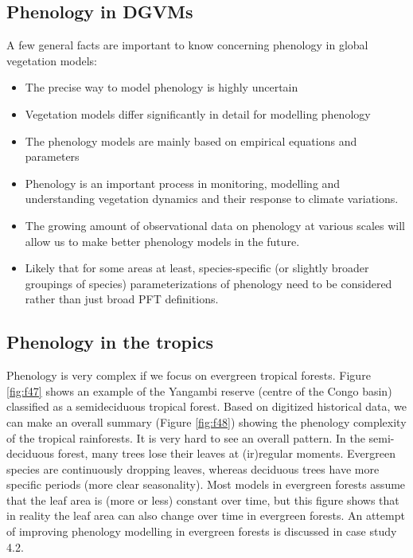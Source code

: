\documentclass[
  12pt,
  oneside]{book}
\begin{document}
\hypertarget{phenology-in-dgvms}{%
\subsection{Phenology in DGVMs}\label{phenology-in-dgvms}}

A few general facts are important to know concerning phenology in global vegetation models:

\begin{itemize}
\item
  The precise way to model phenology is highly uncertain
\item
  Vegetation models differ significantly in detail for modelling phenology
\item
  The phenology models are mainly based on empirical equations and parameters
\item
  Phenology is an important process in monitoring, modelling and understanding vegetation dynamics and their response to climate variations.
\item
  The growing amount of observational data on phenology at various scales will allow us to make better phenology models in the future.
\item
  Likely that for some areas at least, species-specific (or slightly broader groupings of species) parameterizations of phenology need to be considered rather than just broad PFT definitions.
\end{itemize}

\hypertarget{phenology-in-the-tropics}{%
\subsection{Phenology in the tropics}\label{phenology-in-the-tropics}}

Phenology is very complex if we focus on evergreen tropical forests. Figure \ref{fig:f47} shows an example of the Yangambi reserve (centre of the Congo basin) classified as a semideciduous tropical forest. Based on digitized historical data, we can make an overall summary (Figure \ref{fig:f48}) showing the phenology complexity of the tropical rainforests. It is very hard to see an overall pattern. In the semi-deciduous forest, many trees lose their leaves at (ir)regular moments. Evergreen species are continuously dropping leaves, whereas deciduous trees have more specific periods (more clear seasonality). Most models in evergreen forests assume that the leaf area is (more or less) constant over time, but this figure shows that in reality the leaf area can also change over time in evergreen forests. An attempt of improving phenology modelling in evergreen forests is discussed in case study 4.2.
\end{document}
